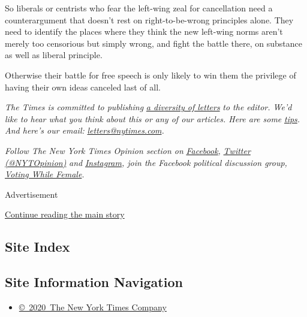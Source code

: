 So liberals or centrists who fear the left-wing zeal for cancellation
need a counterargument that doesn't rest on right-to-be-wrong principles
alone. They need to identify the places where they think the new
left-wing norms aren't merely too censorious but simply wrong, and fight
the battle there, on substance as well as liberal principle.

Otherwise their battle for free speech is only likely to win them the
privilege of having their own ideas canceled last of all.

\emph{The Times is committed to publishing}
\href{https://www.nytimes.com/2019/01/31/opinion/letters/letters-to-editor-new-york-times-women.html}{\emph{a
diversity of letters}} \emph{to the editor. We'd like to hear what you
think about this or any of our articles. Here are some}
\href{https://help.nytimes.com/hc/en-us/articles/115014925288-How-to-submit-a-letter-to-the-editor}{\emph{tips}}\emph{.
And here's our email:}
\href{mailto:letters@nytimes.com}{\emph{letters@nytimes.com}}\emph{.}

\emph{Follow The New York Times Opinion section on}
\href{https://www.facebook.com/nytopinion}{\emph{Facebook}}\emph{,}
\href{http://twitter.com/NYTOpinion}{\emph{Twitter (@NYTOpinion)}}
\emph{and}
\href{https://www.instagram.com/nytopinion/}{\emph{Instagram}}\emph{,
join the Facebook political discussion group,}
\href{https://www.facebook.com/groups/votingwhilefemale/}{\emph{Voting
While Female}}\emph{.}

Advertisement

\protect\hyperlink{after-bottom}{Continue reading the main story}

\hypertarget{site-index}{%
\subsection{Site Index}\label{site-index}}

\hypertarget{site-information-navigation}{%
\subsection{Site Information
Navigation}\label{site-information-navigation}}

\begin{itemize}
\tightlist
\item
  \href{https://help.nytimes.com/hc/en-us/articles/115014792127-Copyright-notice}{©~2020~The
  New York Times Company}
\end{itemize}

